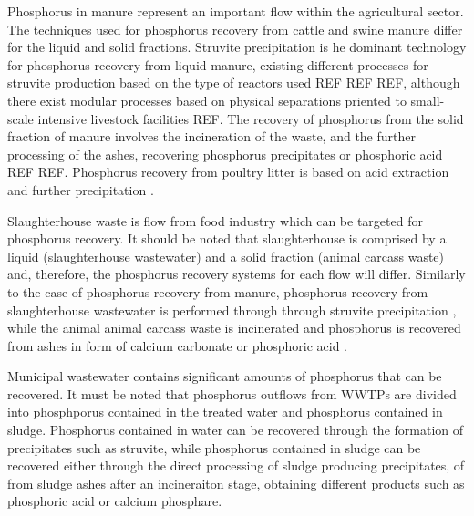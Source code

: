 \documentclass[authoryear]{elsarticle}
\begin{document}
Phosphorus in manure represent an important flow within the agricultural sector.
The techniques used for phosphorus recovery from cattle and swine manure differ for the liquid and solid fractions. Struvite precipitation is he dominant technology for phosphorus recovery from liquid manure, existing different processes for struvite production based on the type of reactors used REF REF REF, although there exist modular processes based on physical separations priented to small-scale intensive livestock facilities REF. The recovery of phosphorus from the solid fraction of manure involves the incineration of the waste, and the further processing of the ashes, recovering phosphorus precipitates or phosphoric acid REF REF. Phosphorus recovery from poultry litter is based on acid extraction and further precipitation \citep{szogi2008phosphorus}.

Slaughterhouse waste is flow from food industry which can be targeted for phosphorus recovery. It should be noted that slaughterhouse is comprised by a liquid (slaughterhouse wastewater) and a solid fraction (animal carcass waste) and, therefore, the phosphorus recovery systems for each flow will differ. Similarly to the case of phosphorus recovery from manure, phosphorus recovery from slaughterhouse wastewater is performed through through struvite precipitation \citep{Pearl2Kcost2}, while the animal animal carcass waste is incinerated and phosphorus is recovered from ashes in form of calcium carbonate or phosphoric acid \citep{jupp2021phosphorus}.

Municipal wastewater contains significant amounts of phosphorus that can be recovered. It must be noted that phosphorus outflows from WWTPs are divided into phosphporus contained in the treated water and phosphorus contained in sludge. Phosphorus contained in water can be recovered through the formation of precipitates such as struvite, while phosphorus contained in sludge can be recovered either through the direct processing of sludge producing precipitates, of from sludge ashes after an incineraiton stage, obtaining different products such as phosphoric acid or calcium phosphare.
\end{document}
